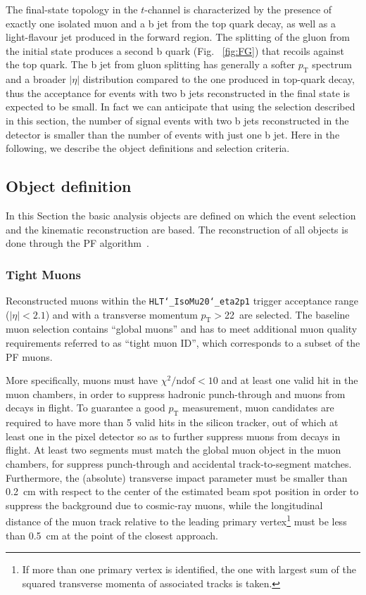The final-state topology in the $t$-channel is characterized by the presence of  exactly one isolated muon and a b jet from the top quark decay, as well as a light-flavour jet produced in the forward region. The splitting of the gluon from the initial state produces a second b quark (Fig. ~\ref{fig:FG}) that recoils against the top quark. The b jet from gluon splitting has generally a softer $p_\mathrm{T}$ spectrum and a broader $|\eta|$ distribution compared to the one produced in top-quark decay, thus the acceptance for events with two b jets reconstructed in the final state is expected to be small. In fact we can anticipate that using the selection described in this section, the number of signal events with two b jets reconstructed in the detector is smaller than the number of events with just one b jet.
Here in the following, we describe the object definitions and selection criteria.


\subsection{Object definition}
\label{sec:objects}

In this Section the basic analysis objects are defined on which the event selection and the kinematic reconstruction are based.
The reconstruction of all objects is done through the PF algorithm~\cite{CMS-PAS-PFT-09-001}. 

 \subsubsection{Tight Muons}
 \label{sec:tight_muon}
 Reconstructed muons within the \texttt{HLT\char`_IsoMu20\char`_eta2p1} trigger acceptance range ($|\eta| < 2.1$) and with a transverse momentum $p_\mathrm{T} >$22~\GeV are selected. The baseline muon selection contains ``global muons'' and has to meet additional muon quality requirements referred to as ``tight muon ID'', which corresponds to a subset of the PF muons. 
 
 More specifically, muons must have $\chi^2/\mathrm{ndof}<10$ and at least one valid hit in the muon chambers, in order to suppress hadronic punch-through and muons from decays in flight. To guarantee a good $p_\mathrm{T}$  measurement, muon candidates are required to have more than 5 valid hits in the silicon tracker, out of which at least one in the pixel detector so as to further suppress muons from decays in flight. At least two segments must match the global muon object in the muon chambers, for suppress punch-through and accidental track-to-segment matches. Furthermore, the (absolute) transverse impact parameter must be smaller than 0.2~cm with respect to the center of the estimated beam spot position in order to suppress the background due to cosmic-ray muons, while the longitudinal distance of the muon track relative to the leading primary vertex\footnote{If more than one primary vertex is identified, the one with largest sum of the squared transverse momenta of associated tracks is taken.} must be less than 0.5~cm at the point of the closest approach.
 
